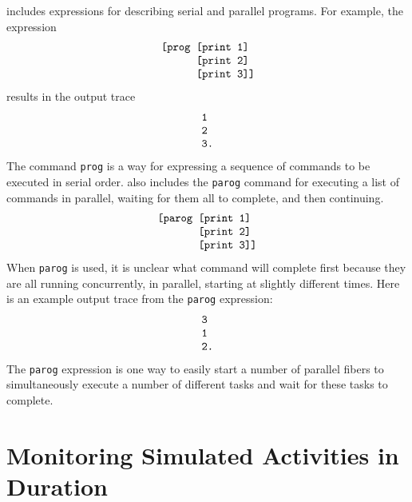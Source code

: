 \FibR includes expressions for describing serial and parallel
programs.  For example, the expression
\begin{equation*}
\begin{array}{l}
\text{\tt [prog [print 1]} \\
\text{\tt ~~~~~~[print 2]} \\
\text{\tt ~~~~~~[print 3]]}
\end{array}
\end{equation*}
results in the output trace
\begin{equation*}
\begin{array}{l}
\text{\tt 1} \\
\text{\tt 2} \\
\text{\tt 3.}
\end{array}
\end{equation*}
The command {\tt prog} is a way for expressing a sequence of commands
to be executed in serial order.  \FibR also includes the {\tt parog}
command for executing a list of commands in parallel, waiting for them
all to complete, and then continuing.
\begin{equation*}
\begin{array}{l}
\text{\tt [parog [print 1]} \\
\text{\tt ~~~~~~~[print 2]} \\
\text{\tt ~~~~~~~[print 3]]}
\end{array}
\end{equation*}
When {\tt parog} is used, it is unclear what command will complete
first because they are all running concurrently, in parallel, starting
at slightly different times.  Here is an example output trace from the
{\tt parog} expression:
\begin{equation*}
\begin{array}{l}
\text{\tt 3} \\
\text{\tt 1} \\
\text{\tt 2.}
\end{array}
\end{equation*}
The {\tt parog} expression is one way to easily start a number of
parallel fibers to simultaneously execute a number of different tasks
and wait for these tasks to complete.

\section{Monitoring Simulated Activities in Duration}

